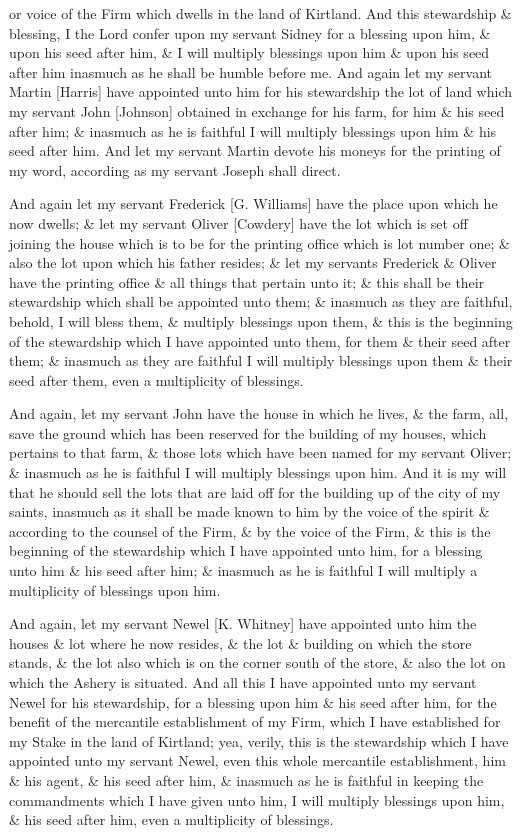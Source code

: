 or voice of the Firm which dwells in the land of Kirtland. And this stewardship \& blessing, I the Lord confer upon my servant Sidney for a blessing upon him, \& upon his seed after him, \& I will multiply blessings upon him \& upon his seed after him inasmuch as he shall be humble before me. And again let my servant Martin [Harris] have appointed unto him for his stewardship the lot of land which my servant John [Johnson] obtained in exchange for his farm, for him \& his seed after him; \& inasmuch as he is faithful I will multiply blessings upon him \& his seed after him. And let my servant Martin devote his moneys for the printing of my word, according as my servant Joseph shall direct.

					And again let my servant Frederick [G. Williams] have the place upon which he now dwells; \& let my servant Oliver [Cowdery] have the lot which is set off joining the house which is to be for the printing office which is lot number one; \& also the lot upon which his father resides; \& let my servants Frederick \& Oliver have the printing office \& all things that pertain unto it; \& this shall be their stewardship which shall be appointed unto them; \& inasmuch as they are faithful, behold, I will bless them, \& multiply blessings upon them, \& this is the beginning of the stewardship which I have appointed unto them, for them \& their seed after them; \& inasmuch as they are faithful I will multiply blessings upon them \& their seed after them, even a multiplicity of blessings.

					And again, let my servant John have the house in which he lives, \& the farm, all, save the ground which has been reserved for the building of my houses, which pertains to that farm, \& those lots which have been named for my servant Oliver; \& inasmuch as he is faithful I will multiply blessings upon him. And it is my will that he should sell the lots that are laid off for the building up of the city of my saints, inasmuch as it shall be made known to him by the voice of the spirit \& according to the counsel of the Firm, \& by the voice of the Firm, \& this is the beginning of the stewardship which I have appointed unto him, for a blessing unto him \& his seed after him; \& inasmuch as he is faithful I will multiply a multiplicity of blessings upon him.

					And again, let my servant Newel [K. Whitney] have appointed unto him the houses \& lot where he now resides, \& the lot \& building on which the store stands, \& the lot also which is on the corner south of the store, \& also the lot on which the Ashery is situated. And all this I have appointed unto my servant Newel for his stewardship, for a blessing upon him \& his seed after him, for the benefit of the mercantile establishment of my Firm, which I have established for my Stake in the land of Kirtland; yea, verily, this is the stewardship which I have appointed unto my servant Newel, even this whole mercantile establishment, him \& his agent, \& his seed after him, \& inasmuch as he is faithful in keeping the commandments which I have given unto him, I will multiply blessings upon him, \& his seed after him, even a multiplicity of blessings.

